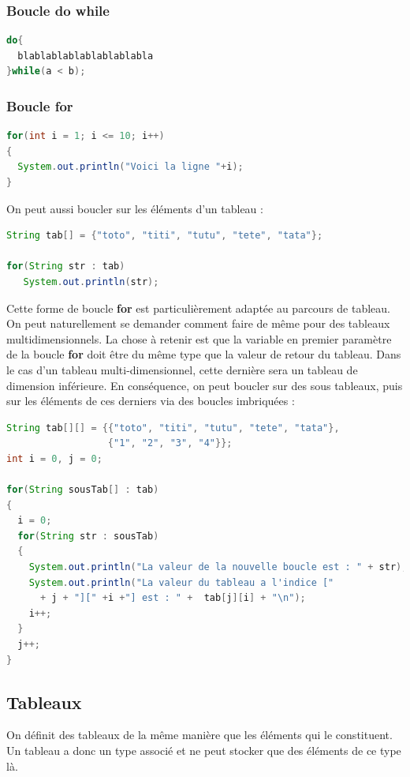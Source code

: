 \documentclass[a4paper,twoside]{article}
\begin{document}
\subsubsection{Boucle do while}
\begin{lstlisting}[language=java]
do{
  blablablablablablablabla
}while(a < b);
\end{lstlisting}

\subsubsection{Boucle for}
\begin{lstlisting}[language=java]
for(int i = 1; i <= 10; i++)
{
  System.out.println("Voici la ligne "+i);
}
\end{lstlisting}

\bigskip

On peut aussi boucler sur les éléments d'un tableau :
\begin{lstlisting}[language=java]
String tab[] = {"toto", "titi", "tutu", "tete", "tata"};
 
for(String str : tab)
   System.out.println(str);
\end{lstlisting}

Cette forme de boucle \textbf{for} est particulièrement adaptée au parcours de tableau. On peut naturellement se demander comment faire de même pour des tableaux multidimensionnels. La chose à retenir est que la variable en premier paramètre de la boucle \textbf{for} doit être du même type que la valeur de retour du tableau. Dans le cas d'un tableau multi-dimensionnel, cette dernière sera un tableau de dimension inférieure. En conséquence, on peut boucler sur des sous tableaux, puis sur les éléments de ces derniers via des boucles imbriquées :
\begin{lstlisting}[language=java]
String tab[][] = {{"toto", "titi", "tutu", "tete", "tata"}, 
                  {"1", "2", "3", "4"}};
int i = 0, j = 0;

for(String sousTab[] : tab)
{
  i = 0;
  for(String str : sousTab)
  {     
    System.out.println("La valeur de la nouvelle boucle est : " + str);
    System.out.println("La valeur du tableau a l'indice [" 
      + j + "][" +i +"] est : " +  tab[j][i] + "\n");
    i++;
  }
  j++;
}
\end{lstlisting}

\subsection{Tableaux}
On définit des tableaux de la même manière que les éléments qui le constituent. Un tableau a donc un type associé et ne peut stocker que des éléments de ce type là.
\end{document}
